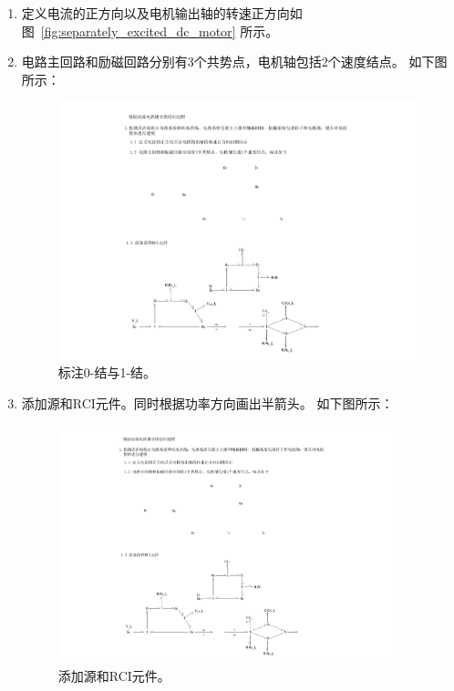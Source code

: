 \begin{enumerate}
	\item 定义电流的正方向以及电机输出轴的转速正方向如图~\ref{fig:separately_excited_dc_motor} 所示。
	
	\item 电路主回路和励磁回路分别有3个共势点，电机轴包括2个速度结点。
	如下图所示：
	\begin{figure}[!h]
		\centering
		\includegraphics[width=1.05\textwidth]{fig/4_1_bond.pdf}
		\caption{标注0-结与1-结。}\label{fig:4_1_bond}
	\end{figure}
	
	\clearpage
	
	\item 添加源和RCI元件。同时根据功率方向画出半箭头。
	如下图所示：
	\begin{figure}[!h]
		\centering
		\includegraphics[width=0.92\textwidth]{fig/4_2_bond.pdf}
		\caption{添加源和RCI元件。}\label{fig:4_2_bond}
	\end{figure}
	

\end{enumerate}
